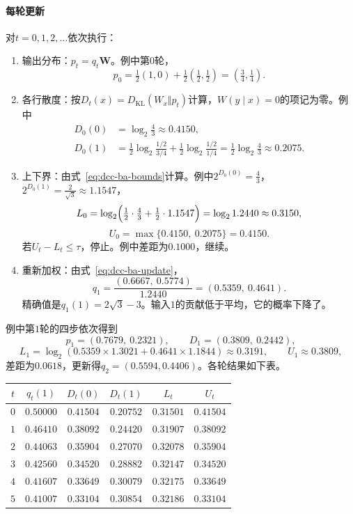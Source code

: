 \paragraph{每轮更新}
对$t=0,1,2,\dots$依次执行：
\begin{enumerate}
 \item 输出分布：$p_t=q_t\bm{W}$。例中第$0$轮，
 \[
  p_0=\tfrac12(1,0)+\tfrac12(\tfrac12,\tfrac12)=(\tfrac34,\tfrac14) .
 \]

 \item 各行散度：按$D_t(x)=D_{\mathrm{KL}}(W_x\Vert p_t)$计算，$W(y\mid x)=0$的项记为零。例中
 \[
  \begin{aligned}
  D_0(0)&=\log_2\frac43\approx0.4150 ,\\
  D_0(1)&=\frac12\log_2\frac{1/2}{3/4}+\frac12\log_2\frac{1/2}{1/4}=\frac12\log_2\frac43\approx0.2075 .
  \end{aligned}
 \]

 \item 上下界：由式~\eqref{eq:dcc-ba-bounds}计算。例中$2^{D_0(0)}=\tfrac43$，$2^{D_0(1)}=\tfrac{2}{\sqrt3}\approx1.1547$，
 \[
  L_0=\log_2\Bigl(\tfrac12\cdot\tfrac43+\tfrac12\cdot1.1547\Bigr)=\log_21.2440\approx0.3150 ,
 \]
 \[
  U_0=\max\{0.4150,\ 0.2075\}=0.4150 .
 \]
 若$U_t-L_t\leq\tau$，停止。例中差距为$0.1000$，继续。

 \item 重新加权：由式~\eqref{eq:dcc-ba-update}，
 \[
  q_1=\frac{(0.6667,\ 0.5774)}{1.2440}=(0.5359,\ 0.4641) .
 \]
 精确值是$q_1(1)=2\sqrt3-3$。输入$1$的贡献低于平均，它的概率下降了。
\end{enumerate}

例中第$1$轮的四步依次得到
\[
 p_1=(0.7679,\ 0.2321),\qquad D_1=(0.3809,\ 0.2442) ,
\]
\[
 L_1=\log_2(0.5359\times1.3021+0.4641\times1.1844)\approx0.3191,\qquad U_1\approx0.3809 ,
\]
差距为$0.0618$，更新得$q_2=(0.5594,0.4406)$。各轮结果如下表。

\begin{BookInlineTable}
 \centering
 \caption{Z信道上Blahut–Arimoto迭代的各轮数值，$q_0=(\tfrac12,\tfrac12)$，容量真值为$\log_2(5/4)\approx0.32193$。}
 \label{tab:dcc-ba-rounds}
 \begin{tabular}{cccccc}
  \toprule
  $t$ & $q_t(1)$ & $D_t(0)$ & $D_t(1)$ & $L_t$ & $U_t$ \\
  \midrule
  $0$ & $0.50000$ & $0.41504$ & $0.20752$ & $0.31501$ & $0.41504$ \\
  $1$ & $0.46410$ & $0.38092$ & $0.24420$ & $0.31907$ & $0.38092$ \\
  $2$ & $0.44063$ & $0.35904$ & $0.27070$ & $0.32078$ & $0.35904$ \\
  $3$ & $0.42560$ & $0.34520$ & $0.28882$ & $0.32147$ & $0.34520$ \\
  $4$ & $0.41607$ & $0.33649$ & $0.30079$ & $0.32175$ & $0.33649$ \\
  $5$ & $0.41007$ & $0.33104$ & $0.30854$ & $0.32186$ & $0.33104$ \\
  \bottomrule
 \end{tabular}
\end{BookInlineTable}

